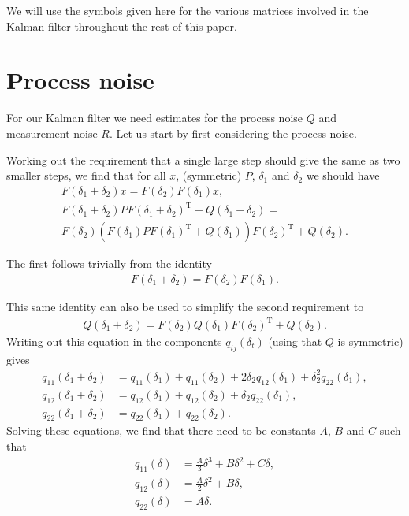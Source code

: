 \documentclass{article}
\begin{document}
We will use the symbols given here for the various matrices involved in the Kalman filter throughout the rest of this paper.

\section{Process noise}\label{sec:processnoise}

For our Kalman filter we need estimates for the process noise $Q$ and measurement noise $R$. Let us start by first considering the process noise.

Working out the requirement that a single large step should give the same as two smaller steps, we find that for all $x$, (symmetric) $P$, $\delta_1$ and $\delta_2$
we should have
\begin{align}
F(\delta_1 + \delta_2)x = F(\delta_2)F(\delta_1)x,\\
F(\delta_1 + \delta_2)PF(\delta_1 + \delta_2)^\mathrm{T} + Q(\delta_1+\delta_2) =\nonumber\\
F(\delta_2)(F(\delta_1)PF(\delta_1)^\mathrm{T} + Q(\delta_1))F(\delta_2)^\mathrm{T} + Q(\delta_2).
\end{align}

The first follows trivially from the identity
\begin{align}
F(\delta_1 + \delta_2) = F(\delta_2)F(\delta_1).
\end{align}

This same identity can also be used to simplify the second requirement to
\begin{align}
Q(\delta_1+\delta_2) = F(\delta_2)Q(\delta_1)F(\delta_2)^\mathrm{T}+Q(\delta_2).
\end{align}
Writing out this equation in the components $q_{ij}(\delta_t)$ (using that $Q$ is symmetric) gives
\begin{align}
q_{11}(\delta_1+\delta_2) &= q_{11}(\delta_1) + q_{11}(\delta_2) + 2\delta_2q_{12}(\delta_1)+\delta_2^2q_{22}(\delta_1),\\
q_{12}(\delta_1+\delta_2) &= q_{12}(\delta_1) + q_{12}(\delta_2) + \delta_2q_{22}(\delta_1),\\
q_{22}(\delta_1+\delta_2) &= q_{22}(\delta_1) + q_{22}(\delta_2).
\end{align}
Solving these equations, we find that there need to be constants $A$, $B$ and $C$ such that 
\begin{align}
q_{11}(\delta) &= \frac{A}{3}\delta^3 + B\delta^2 + C\delta,\\
q_{12}(\delta) &= \frac{A}{2}\delta^2 + B\delta,\\
q_{22}(\delta) &= A\delta.
\end{align}
\end{document}
